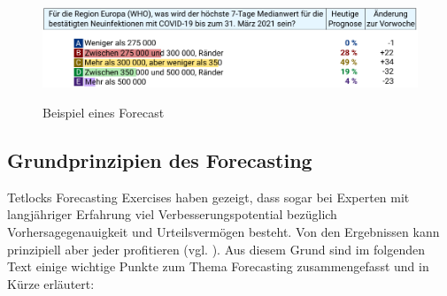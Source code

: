 \begin{figure}%
\centering
\caption{Beispiel eines Forecast}
\includegraphics[scale=0.95]{Grafiken/Forecast_Ink.pdf} 
\label{pic:Forecast}
\end{figure}

\subsection{Grundprinzipien des Forecasting}

Tetlocks Forecasting Exercises haben gezeigt, dass sogar bei Experten mit
langjähriger Erfahrung viel Verbesserungspotential bezüglich
Vorhersagegenauigkeit und Urteilsvermögen besteht. Von den Ergebnissen kann
prinzipiell aber jeder profitieren (vgl. \cite{Economist}). Aus diesem Grund
sind im folgenden Text einige wichtige Punkte zum Thema Forecasting
zusammengefasst und in Kürze erläutert:

